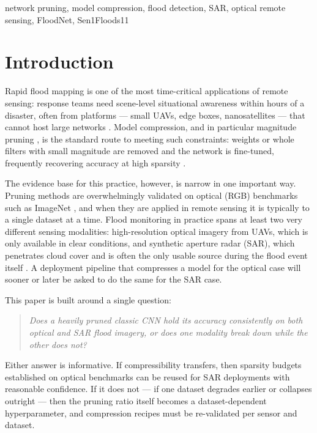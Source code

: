 \documentclass[conference]{IEEEtran}
\begin{document}
\begin{IEEEkeywords}
network pruning, model compression, flood detection, SAR, optical
remote sensing, FloodNet, Sen1Floods11
\end{IEEEkeywords}

\section{Introduction}
Rapid flood mapping is one of the most time-critical applications of
remote sensing: response teams need scene-level situational awareness
within hours of a disaster, often from platforms --- small UAVs, edge
boxes, nanosatellites --- that cannot host large networks
\cite{rahnemoonfar2021floodnet,khan2023floodresnet50}. Model
compression, and in particular magnitude pruning
\cite{han2015learning,li2017pruning}, is the standard route to meeting
such constraints: weights or whole filters with small magnitude are
removed and the network is fine-tuned, frequently recovering accuracy
at high sparsity \cite{blalock2020state}.

The evidence base for this practice, however, is narrow in one
important way. Pruning methods are overwhelmingly validated on optical
(RGB) benchmarks such as ImageNet \cite{deng2009imagenet}, and when
they are applied in remote sensing it is typically to a single dataset
at a time. Flood monitoring in practice spans at least two very
different sensing modalities: high-resolution optical imagery from
UAVs, which is only available in clear conditions, and synthetic
aperture radar (SAR), which penetrates cloud cover and is often the
only usable source during the flood event itself
\cite{bonafilia2020sen1floods11}. A deployment pipeline that
compresses a model for the optical case will sooner or later be asked
to do the same for the SAR case.

This paper is built around a single question:
\begin{quote}
\emph{Does a heavily pruned classic CNN hold its accuracy consistently
on both optical and SAR flood imagery, or does one modality break down
while the other does not?}
\end{quote}
Either answer is informative. If compressibility transfers, then
sparsity budgets established on optical benchmarks can be reused for
SAR deployments with reasonable confidence. If it does not --- if one
dataset degrades earlier or collapses outright --- then the pruning
ratio itself becomes a dataset-dependent hyperparameter, and
compression recipes must be re-validated per sensor and dataset.
\end{document}
